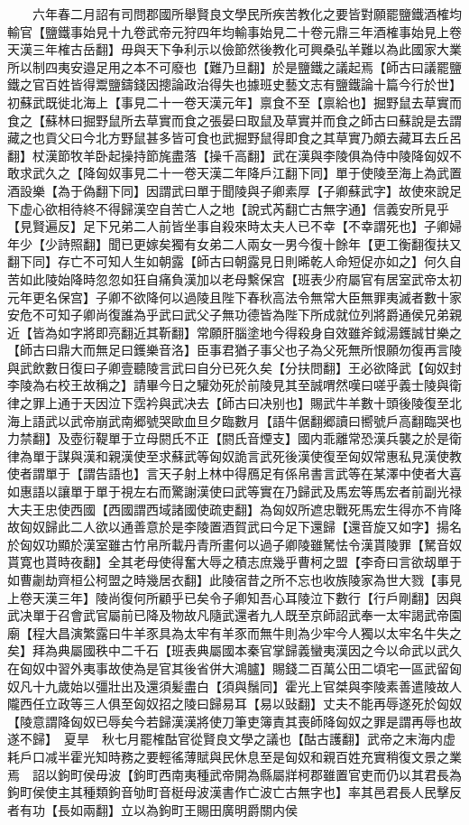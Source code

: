 　　六年春二月詔有司問郡國所舉賢良文學民所疾苦教化之要皆對願罷鹽鐵酒榷均輸官【鹽鐵事始見十九卷武帝元狩四年均輸事始見二十卷元鼎三年酒榷事始見上卷天漢三年榷古岳翻】毋與天下争利示以儉節然後教化可興桑弘羊難以為此國家大業所以制四夷安邉足用之本不可廢也【難乃旦翻】於是鹽鐵之議起焉【師古曰議罷鹽鐵之官百姓皆得鬻鹽鑄錢因摠論政治得失也據班史藝文志有鹽鐵論十篇今行於世】初蘇武既徙北海上【事見二十一卷天漢元年】禀食不至【禀給也】掘野鼠去草實而食之【蘇林曰掘野鼠所去草實而食之張晏曰取鼠及草實并而食之師古曰蘇說是去謂藏之也貢父曰今北方野鼠甚多皆可食也武掘野鼠得即食之其草實乃頗去藏耳去丘呂翻】杖漢節牧羊卧起操持節旄盡落【操千高翻】武在漢與李陵俱為侍中陵降匈奴不敢求武久之【降匈奴事見二十一卷天漢二年降戶江翻下同】單于使陵至海上為武置酒設樂【為于偽翻下同】因謂武曰單于聞陵與子卿素厚【子卿蘇武字】故使來說足下虚心欲相待終不得歸漢空自苦亡人之地【說式芮翻亡古無字通】信義安所見乎【見賢遍反】足下兄弟二人前皆坐事自殺來時太夫人已不幸【不幸謂死也】子卿婦年少【少詩照翻】聞已更嫁矣獨有女弟二人兩女一男今復十餘年【更工衡翻復扶又翻下同】存亡不可知人生如朝露【師古曰朝露見日則晞乾人命短促亦如之】何久自苦如此陵始降時忽忽如狂自痛負漢加以老母繫保宫【班表少府屬官有居室武帝太初元年更名保宫】子卿不欲降何以過陵且陛下春秋高法令無常大臣無罪夷滅者數十家安危不可知子卿尚復誰為乎武曰武父子無功德皆為陛下所成就位列將爵通侯兄弟親近【皆為如字將即亮翻近其靳翻】常願肝腦塗地今得殺身自效雖斧鉞湯鑊誠甘樂之【師古曰鼎大而無足曰鑊樂音洛】臣事君猶子事父也子為父死無所恨願勿復再言陵與武飲數日復曰子卿壹聽陵言武曰自分已死久矣【分扶問翻】王必欲降武【匈奴封李陵為右校王故稱之】請畢今日之驩効死於前陵見其至誠喟然嘆曰嗟乎義士陵與衛律之罪上通于天因泣下霑衿與武决去【師古曰决别也】賜武牛羊數十頭後陵復至北海上語武以武帝崩武南郷號哭歐血旦夕臨數月【語牛倨翻郷讀曰嚮號戶高翻臨哭也力禁翻】及壺衍鞮單于立母閼氏不正【閼氏音煙支】國内乖離常恐漢兵襲之於是衛律為單于謀與漢和親漢使至求蘇武等匈奴詭言武死後漢使復至匈奴常惠私見漢使教使者謂單于【謂告語也】言天子射上林中得鴈足有係帛書言武等在某澤中使者大喜如惠語以讓單于單于視左右而驚謝漢使曰武等實在乃歸武及馬宏等馬宏者前副光禄大夫王忠使西國【西國謂西域諸國使疏吏翻】為匈奴所遮忠戰死馬宏生得亦不肯降故匈奴歸此二人欲以通善意於是李陵置酒賀武曰今足下還歸【還音旋又如字】揚名於匈奴功顯於漢室雖古竹帛所載丹青所畫何以過子卿陵雖駑怯令漢貰陵罪【駑音奴貰寛也貰時夜翻】全其老母使得奮大辱之積志庶幾乎曹柯之盟【李奇曰言欲刼單于如曹劌劫齊桓公柯盟之時幾居衣翻】此陵宿昔之所不忘也收族陵家為世大戮【事見上卷天漢三年】陵尚復何所顧乎已矣令子卿知吾心耳陵泣下數行【行戶剛翻】因與武决單于召會武官屬前已降及物故凡隨武還者九人既至京師詔武奉一太牢謁武帝園廟【程大昌演繁露曰牛羊豕具為太牢有羊豕而無牛則為少牢今人獨以太牢名牛失之矣】拜為典屬國秩中二千石【班表典屬國本秦官掌歸義蠻夷漢因之今以命武以武久在匈奴中習外夷事故使為是官其後省併大鴻臚】賜錢二百萬公田二頃宅一區武留匈奴凡十九歲始以彊壯出及還須髪盡白【須與鬚同】霍光上官桀與李陵素善遣陵故人隴西任立政等三人俱至匈奴招之陵曰歸易耳【易以䜴翻】丈夫不能再辱遂死於匈奴【陵意謂降匈奴已辱矣今若歸漢漢將使刀筆吏簿責其喪師降匈奴之罪是謂再辱也故遂不歸】　夏旱　秋七月罷榷酤官從賢良文學之議也【酤古護翻】武帝之末海内虚耗戶口减半霍光知時務之要輕徭薄賦與民休息至是匈奴和親百姓充實稍復文景之業焉　詔以鉤町侯毋波【鉤町西南夷種武帝開為縣屬牂柯郡雖置官吏而仍以其君長為鉤町侯使主其種類鉤音劬町音梃母波漢書作亡波亡古無字也】率其邑君長人民擊反者有功【長如兩翻】立以為鉤町王賜田廣明爵關内侯

